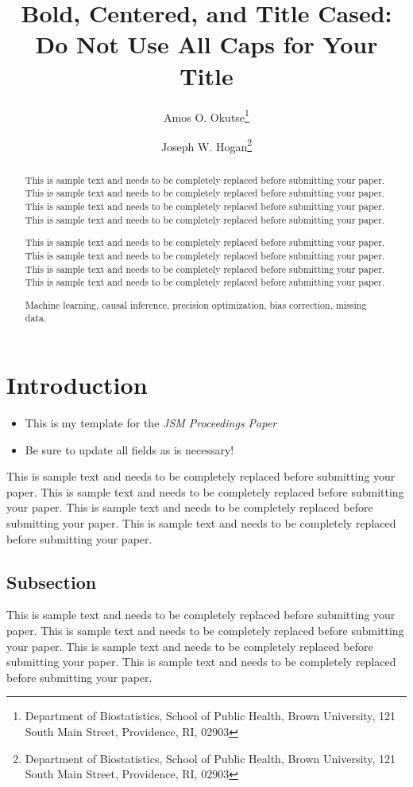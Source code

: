 \documentclass[11pt]{asaproc}
\title{Bold, Centered, and Title Cased: Do Not Use All Caps for Your Title}
\author{Amos O. Okutse\thanks{Department of Biostatistics, School of Public Health, Brown University, 121 South Main Street, Providence, RI, 02903} \and  Joseph W. Hogan\thanks{Department of Biostatistics, School of Public Health, Brown University, 121 South Main Street, Providence, RI, 02903} %
}
\begin{document}
\maketitle

\begin{abstract}
This is sample text and needs to be completely replaced before submitting your paper. This is sample text and needs to be completely replaced before submitting your paper. This is sample text and needs to be completely replaced before submitting your paper. This is sample text and needs to be completely replaced before submitting your paper.

This is sample text and needs to be completely replaced before submitting your paper. This is sample text and needs to be completely replaced before submitting your paper. This is sample text and needs to be completely replaced before submitting your paper. This is sample text and needs to be completely replaced before submitting your paper.
\begin{keywords}
Machine learning, causal inference, precision optimization, bias correction, missing data.
\end{keywords}
\end{abstract}


\hypertarget{introduction}{%
\section{Introduction}\label{introduction}}

\begin{itemize}
\item
  This is my template for the \emph{JSM Proceedings Paper}
\item
  Be sure to update all fields as is necessary!
\end{itemize}

This is sample text and needs to be completely replaced before submitting your paper. This is sample text and needs to be completely replaced before submitting your paper. This is sample text and needs to be completely replaced before submitting your paper. This is sample text and needs to be completely replaced before submitting your paper.

\hypertarget{subsection}{%
\subsection{Subsection}\label{subsection}}

This is sample text and needs to be completely replaced before submitting your paper. This is sample text and needs to be completely replaced before submitting your paper. This is sample text and needs to be completely replaced before submitting your paper. This is sample text and needs to be completely replaced before submitting your paper.
\end{document}
